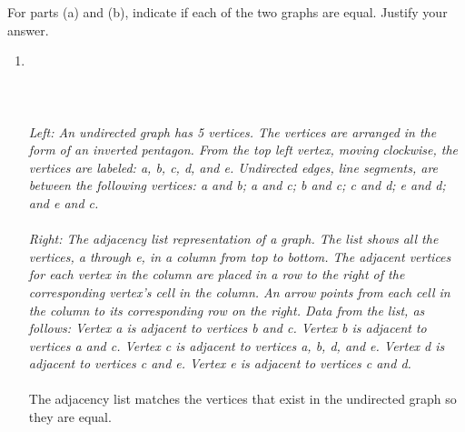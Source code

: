 \documentclass{amsart}
\theoremstyle{definition}
\theoremstyle{Exercise}
\theoremstyle{remark}
\theoremstyle{rule}
\numberwithin{equation}{section}
\begin{document}
For parts (a) and (b), indicate if each of the two graphs are equal. Justify your answer.\\
 \begin{enumerate}[label=(\alph*)]
 

  \item
\hfil
\\\\
\\\\
 {\color{blue}{\bf Figure 1:} \emph{Left: An undirected graph has 5 vertices. The vertices are arranged in the form of an inverted pentagon. From the top left vertex, moving clockwise, the vertices are labeled: a, b, c, d, and e. Undirected edges, line segments, are between the following vertices: a and b; a and c; b and c; c and d; e and d; and e and c. \\
 }
 }\\
{\color{blue}{\bf Figure 2:} \emph{
  Right: The adjacency list representation of a graph. The list shows all the vertices, a through e, in a column from top to bottom. The adjacent vertices for each vertex in the column are placed in a row to the right of the corresponding vertex’s cell in the column. An arrow points from each cell in the column to its corresponding row on the right. Data from the list, as follows: Vertex a is adjacent to vertices b and c. Vertex b is adjacent to vertices a and c. Vertex c is adjacent to vertices a, b, d, and e. Vertex d is adjacent to vertices c and e. Vertex e is adjacent to vertices c and d.
}
}
\\\\
The adjacency list matches the vertices that exist in the undirected graph so they are equal.


\end{enumerate}
\end{document}
